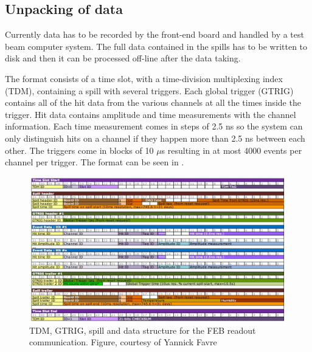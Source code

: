 \subsection{Unpacking of data}


Currently data has to be recorded by the front-end board and handled by a test beam computer system. The full data contained in the spills has to be written to disk and then it can be processed off-line after the data taking.

The format consists of a time slot, with a time-division multiplexing index (TDM), containing a spill with several triggers. Each global trigger (GTRIG) contains all of the hit data from the various channels at all the times inside the trigger. Hit data contains amplitude and time measurements with the channel information.
Each time measurement comes in steps of 2.5 ns so the system can only distinguish hits on a channel if they happen more than 2.5 ns between each other. The triggers come in blocks of 10 $\mu$s resulting in at most 4000 events per channel per trigger. The format can be seen in .


\begin{figure}[h!]
\centering
\includegraphics[width=\textwidth]{figures/febstructure.jpeg}
\caption{TDM, GTRIG, spill and data structure for the FEB readout communication. Figure, courtesy of Yannick Favre}
\label{fig:FEBstructure}
\end{figure}



